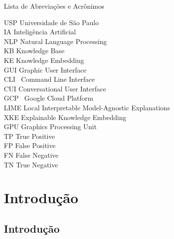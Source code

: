 \documentclass[]{politex}
\begin{document}
\listadefiguras
\listadetabelas

\begin{pretextualsection}{Lista de Abreviações e Acrônimos}

\begin{flushleft}
USP \:\:\:\:\:\:\:\:\: Universidade de São Paulo \\
IA \:\:\:\:\:\:\:\:\:\:\:\:\: Inteligência Artificial \\
NLP \:\:\:\:\:\:\:\:\: Natural Language Processing \\
KB \:\:\:\:\:\:\:\:\:\:\:\: Knowledge Base \\
KE \:\:\:\:\:\:\:\:\:\:\:\: Knowledge Embedding \\
GUI \:\:\:\:\:\:\:\:\:\: Graphic User Interface \\
CLI \:\:\:\:\:\:\:\:\:\:\, Command Line Interface \\
CUI \:\:\:\:\:\:\:\:\:\: Conversational User Interface \\
GCP \:\:\:\:\:\:\:\:\, Google Cloud Platform \\
LIME \:\:\:\:\:\:\: Local Interpretable Model-Agnostic Explanations \\
XKE \:\:\:\:\:\:\:\:\: Explainable Knowledge Embedding \\
GPU \:\:\:\:\:\:\:\:\: Graphics Processing Unit \\
TP \:\:\:\:\:\:\:\:\:\:\:\:\: True Positive  \\
FP \:\:\:\:\:\:\:\:\:\:\:\:\: False Positive \\
FN \:\:\:\:\:\:\:\:\:\:\:\:\: False Negative \\
TN \:\:\:\:\:\:\:\:\:\:\:\:\: True Negative

\end{flushleft}

\end{pretextualsection}

\sumario




\part{Introdução}
	
\chapter{Introdução}
\end{document}
